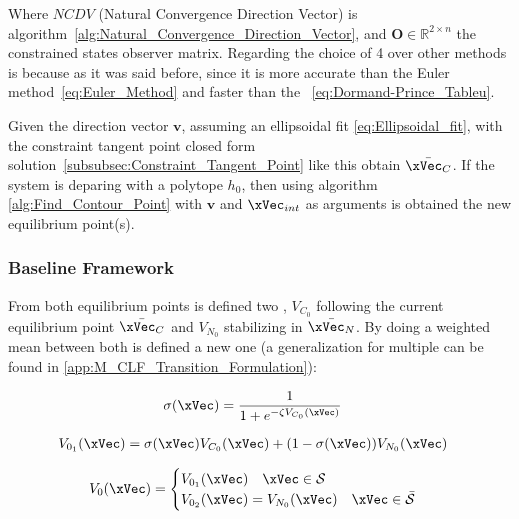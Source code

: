 Where \(NCDV\) (Natural Convergence Direction Vector) is algorithm~\ref{alg:Natural_Convergence_Direction_Vector}, and \(\mathbf{O} \in \mathbb{R}^{2 \times n}\) the constrained states observer matrix. Regarding the choice of 4 over other methods is because as it was said before, since it is more accurate than the Euler method~\ref{eq:Euler_Method} and faster than the ~\ref{eq:Dormand-Prince_Tableu}. \par
Given the direction vector \(\mathbf{v}\), assuming an ellipsoidal fit \ref{eq:Ellipsoidal_fit}, with the constraint tangent point  closed form solution~\ref{subsubsec:Constraint_Tangent_Point} like this obtain \(\bar{\xVec_C}\). If the system is deparing with a polytope  \(h_0\), then using algorithm \ref{alg:Find_Contour_Point} with \(\mathbf{v}\) and \(\xVec_{int}\) as arguments is obtained the new equilibrium point(s).\\


\subsubsection{Baseline Framework}
\label{subsubsec:CLFs_Summed_Algorithm_Baseline_Framework}

From both equilibrium points is defined two , \(V_{C_0}\) following the current equilibrium point \(\bar{\xVec_C}\) and \(V_{N_0}\) stabilizing in \(\bar{\xVec_N}\). By doing a weighted  mean between both  is defined a new one (a generalization for multiple  can be found in \ref{app:M_CLF_Transition_Formulation}):

\begin{align}
    &\sigma(\xVec) = \frac{1}{1+e^{-\zeta V_{C_0}(\xVec)}} \label{eq:sig_CLF_Vc0} 
\end{align}

\begin{align}
    &V_{0_1}(\xVec) =    \sigma(\xVec) V_{C_0}(\xVec) + (1 - \sigma(\xVec))V_{N_0}(\xVec) \label{eq:1stPhase_2-CLF-S}   
\end{align}

\begin{align}
    V_0(\xVec) = 
    \begin{cases}
        V_{0_1}(\xVec) \quad \xVec \in \mathcal{S}\\
        V_{0_2}(\xVec) = V_{N_0}(\xVec) \quad \xVec \in \bar{\mathcal{S}}
    \end{cases}
    \label{eq:New_2-CLF-S}
\end{align}

